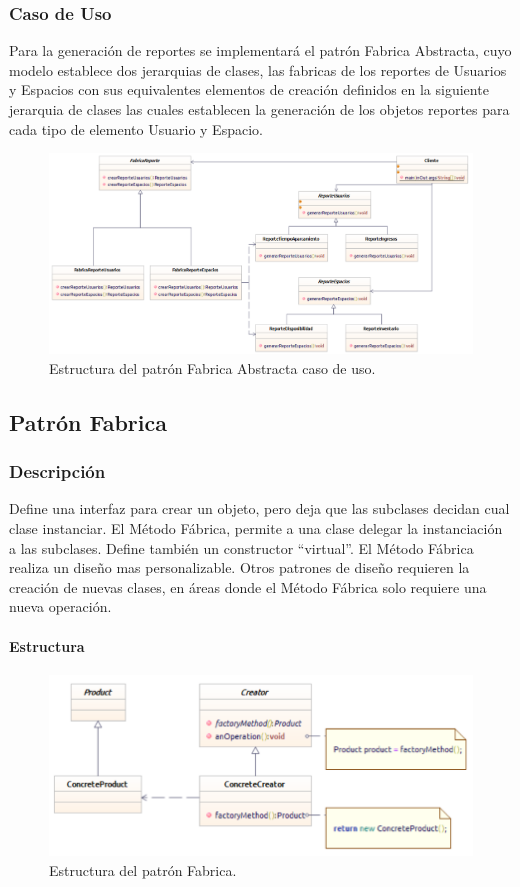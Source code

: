 \subsubsection{Caso de Uso}
Para la generación de reportes se implementará el patrón Fabrica Abstracta, cuyo modelo establece dos jerarquias de clases, las fabricas de los reportes de Usuarios y Espacios con sus equivalentes elementos de creación definidos en la siguiente jerarquia de clases las cuales establecen la generación de los objetos reportes para cada tipo de elemento Usuario y Espacio.

\begin{figure}[th!]
	\centering
	\includegraphics[width=.7\linewidth]{imagenes/Patrones/Fabrica_caso.pdf}
	\caption{Estructura del patrón Fabrica Abstracta caso de uso.\cite{gof}}	
\end{figure}

\subsection{Patrón Fabrica}
\subsubsection{Descripción}
Define una interfaz para crear un objeto, pero deja que las subclases decidan cual clase instanciar. El Método Fábrica, permite a una clase delegar la instanciación a las subclases. Define también un constructor “virtual”.
El Método Fábrica realiza un diseño mas personalizable. Otros patrones de diseño requieren la creación de nuevas clases, en áreas donde el Método Fábrica solo requiere una nueva operación.


\paragraph{Estructura}

\begin{figure}[th!]
	\centering
	\includegraphics[width=.7\linewidth]{imagenes/Patrones/Builder.pdf}
	\caption{Estructura del patrón Fabrica.\cite{gof}}	
\end{figure}

